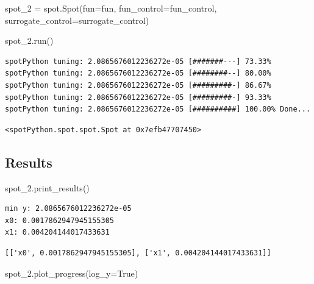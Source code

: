 \documentclass[
  letterpaper,
  DIV=11,
  numbers=noendperiod]{scrreprt}
\newenvironment{Shaded}{\begin{snugshade}}{\end{snugshade}}
\newcommand{\NormalTok}[1]{\textcolor[rgb]{0.00,0.23,0.31}{#1}}
\newcommand{\OperatorTok}[1]{\textcolor[rgb]{0.37,0.37,0.37}{#1}}
\newcommand{\VariableTok}[1]{\textcolor[rgb]{0.07,0.07,0.07}{#1}}
\begin{document}
\begin{Shaded}
\begin{Highlighting}[]
\NormalTok{spot\_2 }\OperatorTok{=}\NormalTok{ spot.Spot(fun}\OperatorTok{=}\NormalTok{fun,}
\NormalTok{                   fun\_control}\OperatorTok{=}\NormalTok{fun\_control,}
\NormalTok{                   surrogate\_control}\OperatorTok{=}\NormalTok{surrogate\_control)}

\NormalTok{spot\_2.run()}
\end{Highlighting}
\end{Shaded}

\begin{verbatim}
spotPython tuning: 2.0865676012236272e-05 [#######---] 73.33% 
spotPython tuning: 2.0865676012236272e-05 [########--] 80.00% 
spotPython tuning: 2.0865676012236272e-05 [#########-] 86.67% 
spotPython tuning: 2.0865676012236272e-05 [#########-] 93.33% 
spotPython tuning: 2.0865676012236272e-05 [##########] 100.00% Done...
\end{verbatim}

\begin{verbatim}
<spotPython.spot.spot.Spot at 0x7efb47707450>
\end{verbatim}

\subsection{Results}\label{results-7}

\begin{Shaded}
\begin{Highlighting}[]
\NormalTok{spot\_2.print\_results()}
\end{Highlighting}
\end{Shaded}

\begin{verbatim}
min y: 2.0865676012236272e-05
x0: 0.0017862947945155305
x1: 0.004204144017433631
\end{verbatim}

\begin{verbatim}
[['x0', 0.0017862947945155305], ['x1', 0.004204144017433631]]
\end{verbatim}

\begin{Shaded}
\begin{Highlighting}[]
\NormalTok{spot\_2.plot\_progress(log\_y}\OperatorTok{=}\VariableTok{True}\NormalTok{)}
\end{Highlighting}
\end{Shaded}
\end{document}
